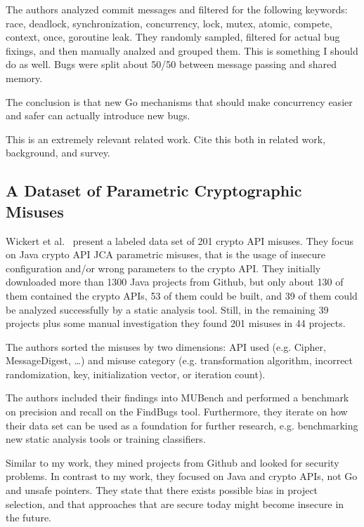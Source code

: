 The authors analyzed commit messages and filtered for the following keywords: race, deadlock, synchronization,
concurrency, lock, mutex, atomic, compete, context, once, goroutine leak.
They randomly sampled, filtered for actual bug fixings, and then manually analzed and grouped them.
This is something I should do as well.
Bugs were split about 50/50 between message passing and shared memory.

The conclusion is that new Go mechanisms that should make concurrency easier and safer can actually introduce new bugs.

This is an extremely relevant related work.
Cite this both in related work, background, and survey.



\subsection{A Dataset of Parametric Cryptographic Misuses}
\label{subsec:a-dataset-of-parametric-cryptographic-misuses}

Wickert et al.~\cite{wickert2019} present a labeled data set of 201 crypto API misuses.
They focus on Java crypto API JCA parametric misuses, that is the usage of insecure configuration and/or wrong
parameters to the crypto API.
They initially downloaded more than 1300 Java projects from Github, but only about 130 of them contained the crypto
APIs, 53 of them could be built, and 39 of them could be analyzed successfully by a static analysis tool.
Still, in the remaining 39 projects plus some manual investigation they found 201 misuses in 44 projects.

The authors sorted the misuses by two dimensions: API used (e.g. Cipher, MessageDigest, \ldots) and misuse category (e.g.
transformation algorithm, incorrect randomization, key, initialization vector, or iteration count).

The authors included their findings into MUBench and performed a benchmark on precision and recall on the FindBugs tool.
Furthermore, they iterate on how their data set can be used as a foundation for further research, e.g. benchmarking new
static analysis tools or training classifiers.

Similar to my work, they mined projects from Github and looked for security problems.
In contrast to my work, they focused on Java and crypto APIs, not Go and unsafe pointers.
They state that there exists possible bias in project selection, and that approaches that are secure today might become
insecure in the future.

